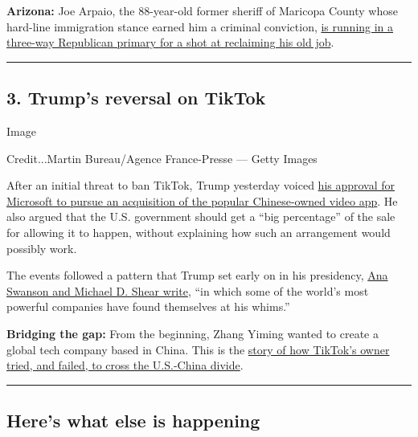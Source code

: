 \textbf{Arizona:} Joe Arpaio, the 88-year-old former sheriff of Maricopa
County whose hard-line immigration stance earned him a criminal
conviction,
\href{https://www.nytimes3xbfgragh.onion/2020/08/02/us/politics/arizona-election-joe-arpaio.html}{is
running in a three-way Republican primary for a shot at reclaiming his
old job}.

\begin{center}\rule{0.5\linewidth}{\linethickness}\end{center}

\hypertarget{3-trumps-reversal-on-tiktok}{%
\subsection{3. Trump's reversal on
TikTok}\label{3-trumps-reversal-on-tiktok}}

Image

Credit...Martin Bureau/Agence France-Presse --- Getty Images

After an initial threat to ban TikTok, Trump yesterday voiced
\href{https://www.nytimes3xbfgragh.onion/2020/08/03/technology/trump-tiktok-microsoft.html}{his
approval for Microsoft to pursue an acquisition of the popular
Chinese-owned video app}. He also argued that the U.S. government should
get a ``big percentage'' of the sale for allowing it to happen, without
explaining how such an arrangement would possibly work.

The events followed a pattern that Trump set early on in his presidency,
\href{https://www.nytimes3xbfgragh.onion/2020/08/03/business/economy/trump-tiktok-china-business.html}{Ana
Swanson and Michael D. Shear write}, ``in which some of the world's most
powerful companies have found themselves at his whims.''

\textbf{Bridging the gap:} From the beginning, Zhang Yiming wanted to
create a global tech company based in China. This is the
\href{https://www.nytimes3xbfgragh.onion/2020/08/03/technology/tiktok-bytedance-us-china.html}{story
of how TikTok's owner tried, and failed, to cross the U.S.-China
divide}.

\begin{center}\rule{0.5\linewidth}{\linethickness}\end{center}

\hypertarget{heres-what-else-is-happening}{%
\subsection{Here's what else is
happening}\label{heres-what-else-is-happening}}

